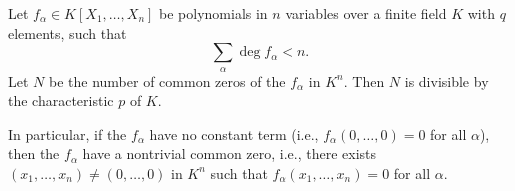Let $f_\alpha \in K[X_1, \ldots, X_n]$ be polynomials in $n$ variables over a finite field $K$ with $q$ elements, such that
$$\sum_{\alpha} \deg f_\alpha < n.$$
Let $N$ be the number of common zeros of the $f_\alpha$ in $K^n$. Then $N$ is divisible by the characteristic $p$ of $K$.

In particular, if the $f_\alpha$ have no constant term (i.e., $f_\alpha(0,\ldots,0) = 0$ for all $\alpha$), then the $f_\alpha$ have a nontrivial common zero, i.e., there exists $(x_1,\ldots,x_n) \neq (0,\ldots,0)$ in $K^n$ such that $f_\alpha(x_1,\ldots,x_n) = 0$ for all $\alpha$.
